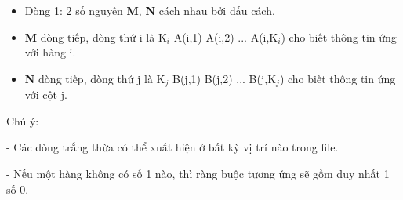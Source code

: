 \begin{itemize}
	\item Dòng 1: 2 số nguyên \textbf{M}, \textbf{N} cách nhau bởi dấu cách.
	\item \textbf{M} dòng tiếp, dòng thứ i là K$_i$ A(i,1) A(i,2) ... A(i,K$_i$) cho biết thông tin ứng với hàng i.
	\item \textbf{N} dòng tiếp, dòng thứ j là K$_j$ B(j,1) B(j,2) ... B(j,K$_j$) cho biết thông tin ứng với cột j.
\end{itemize}

Chú ý:

- Các dòng trắng thừa có thể xuất hiện ở bất kỳ vị trí nào trong file.

- Nếu một hàng không có số 1 nào, thì ràng buộc tương ứng sẽ gồm duy nhất 1 số 0.